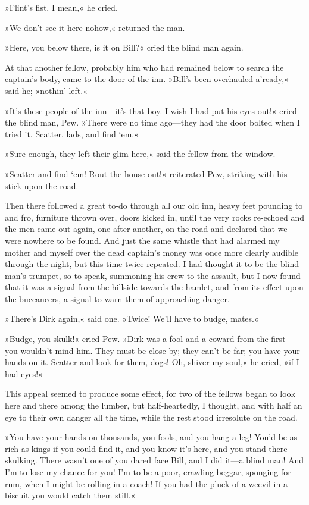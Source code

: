 »Flint's fist, I mean,« he cried.

»We don't see it here nohow,« returned the man.

»Here, you below there, is it on Bill?« cried the blind man again.

At that another fellow, probably him who had remained below to search the captain's body, came to the door of the inn. »Bill's been overhauled a'ready,« said he; »nothin' left.«

»It's these people of the inn—it's that boy. I wish I had put his eyes out!« cried the blind man, Pew. »There were no time ago—they had the door bolted when I tried it. Scatter, lads, and find `em.«

»Sure enough, they left their glim here,« said the fellow from the window.

»Scatter and find `em! Rout the house out!« reiterated Pew, striking with his stick upon the road.

Then there followed a great to-do through all our old inn, heavy feet pounding to and fro, furniture thrown over, doors kicked in, until the very rocks re-echoed and the men came out again, one after another, on the road and declared that we were nowhere to be found. And just the same whistle that had alarmed my mother and myself over the dead captain's money was once more clearly audible through the night, but this time twice repeated. I had thought it to be the blind man's trumpet, so to speak, summoning his crew to the assault, but I now found that it was a signal from the hillside towards the hamlet, and from its effect upon the buccaneers, a signal to warn them of approaching danger.

»There's Dirk again,« said one. »Twice! We'll have to budge, mates.«

»Budge, you skulk!« cried Pew. »Dirk was a fool and a coward from the first—you wouldn't mind him. They must be close by; they can't be far; you have your hands on it. Scatter and look for them, dogs! Oh, shiver my soul,« he cried, »if I had eyes!«

This appeal seemed to produce some effect, for two of the fellows began to look here and there among the lumber, but half-heartedly, I thought, and with half an eye to their own danger all the time, while the rest stood irresolute on the road.

»You have your hands on thousands, you fools, and you hang a leg! You'd be as rich as kings if you could find it, and you know it's here, and you stand there skulking. There wasn't one of you dared face Bill, and I did it—a blind man! And I'm to lose my chance for you! I'm to be a poor, crawling beggar, sponging for rum, when I might be rolling in a coach! If you had the pluck of a weevil in a biscuit you would catch them still.«

